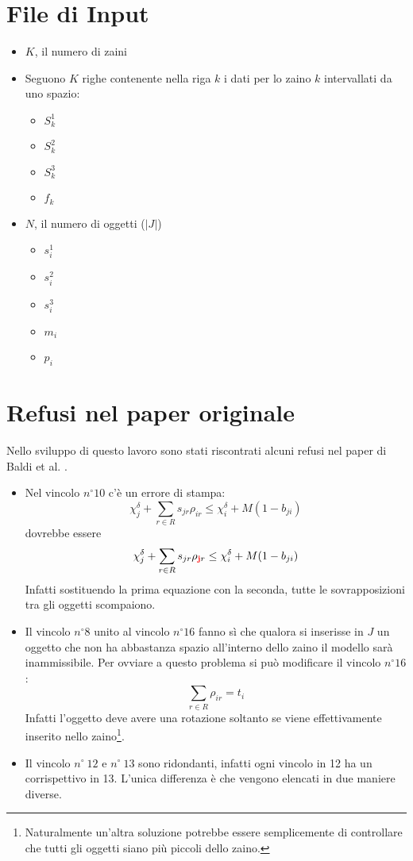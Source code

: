 \documentclass{scrartcl}
\begin{document}
\section{File di Input}
\begin{itemize}
	\item $K$, il numero di zaini
	\item Seguono $K$ righe contenente nella riga $k$ i dati per lo zaino $k$ intervallati da uno spazio:
	\begin{itemize}
		\item $S_k^1$
		\item $S_k^2$
		\item $S_k^3$
		\item $f_k$
	\end{itemize} 
	\item $N$, il numero di oggetti ($|J|$)
	\begin{itemize}
		\item $s_i^1$
		\item $s_i^2$
		\item $s_i^3$
		\item $m_i$
		\item $p_i$
	\end{itemize}
\end{itemize}

\section{Refusi nel paper originale}
Nello sviluppo di questo lavoro sono stati riscontrati alcuni refusi nel paper di Baldi et al. \cite{Baldi20129802}.
\begin{itemize}
	\item Nel vincolo $n^\circ 10$ c'è un errore di stampa:
	$$
	\chi_j^\delta + \sum_{r\in R} s_{jr}\rho_{ir} \leq \chi_i^\delta + M(1-b_{ji})
	$$
	dovrebbe essere 
	$$
	\chi_j^\delta + \sum_{r\in R} s_{jr}\rho_{\mathbf{\color{red}j}r} \leq \chi_i^\delta + M(1-b_{ji})
	$$
	Infatti sostituendo la prima equazione con la seconda, tutte le sovrapposizioni tra gli oggetti scompaiono.
	\item Il vincolo $n^\circ 8$ unito al vincolo $n^\circ 16$ fanno sì che qualora si inserisse in $J$ un oggetto che non ha abbastanza spazio all'interno dello zaino il modello sarà inammissibile. Per ovviare a questo problema si può modificare il vincolo $n^\circ 16$:
	$$
	\sum_{r \in R} \rho_{ir} = t_i
	$$
	Infatti l'oggetto deve avere una rotazione soltanto se viene effettivamente inserito nello zaino\footnote{ 
	Naturalmente un'altra soluzione potrebbe essere semplicemente di controllare che tutti gli oggetti siano più piccoli dello zaino.}.
	\item Il vincolo $n^\circ\ 12$ e $n^\circ\ 13$ sono ridondanti, infatti ogni vincolo in 12 ha un corrispettivo in 13. L'unica differenza è che vengono elencati in due maniere diverse.
\end{itemize}




\end{document}
